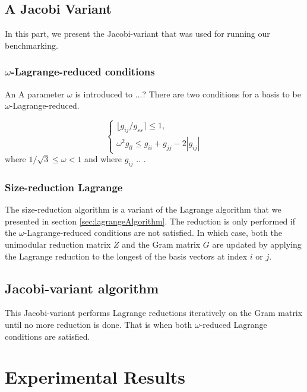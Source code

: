 \documentclass[10pt, a4paper]{article}
\newcommand{\my}[1]{{\color{blue} #1 }}
\begin{document}



\subsection{A Jacobi Variant}

In this part, we present the Jacobi-variant that was used for running our benchmarking.

\subsubsection{$\omega$-Lagrange-reduced conditions}
An \my{A parameter} $\omega$ is introduced to \my{...? }
There are two conditions for a basis to be $\omega$-Lagrange-reduced.

\[
\begin{cases}
\lfloor g_{ij} / g_{ss} \rceil \leq 1, \\
\omega^2 g_{ll} \leq g_{ii} + g_{jj} - 2|g_{ij}|

\end{cases}
\]  where $1/\sqrt{3} \leq \omega < 1$ \my{and where $g_{ij}$}.. .

\subsubsection{Size-reduction Lagrange}
The size-reduction algorithm is a variant of the Lagrange algorithm that we presented in section \ref{sec:lagrangeAlgorithm}. The reduction is only performed if the $\omega$-Lagrange-reduced conditions are not satisfied. In which case, both the unimodular reduction matrix $Z$ and the Gram matrix $G$ are updated by applying the Lagrange reduction to the longest of the basis vectors at index $i$ or $j$.



\subsection{Jacobi-variant algorithm}
This Jacobi-variant performs Lagrange reductions iteratively on the Gram matrix until no more reduction is done. That is when both $\omega$-reduced Lagrange conditions are satisfied. 



\section{Experimental Results}
\end{document}
